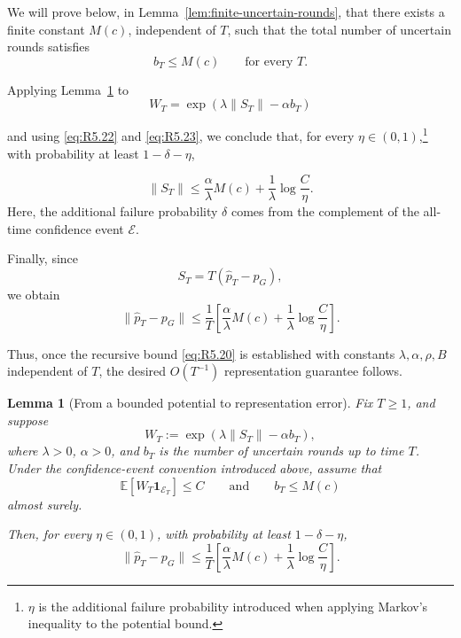 \documentclass[twoside]{article}
\newtheorem{lemma}{Lemma}
\begin{document}
We will prove below, in Lemma~\ref{lem:finite-uncertain-rounds}, that there
exists a finite constant \(M(c)\), independent of \(T\), such that the total
number of uncertain rounds satisfies
\begin{equation}
    b_T\le M(c)
    \qquad\text{for every }T.
    \tag{R5.23}
    \label{eq:R5.23}
\end{equation}

Applying Lemma~\ref{lem:potential-to-representation} to
\[
    W_T
    =
    \exp\left(
        \lambda\|S_T\|-\alpha b_T
    \right)
\]

and using \eqref{eq:R5.22} and \eqref{eq:R5.23}, we conclude that, for every
\(\eta\in(0,1)\),\footnote{\(\eta\) is the additional failure probability
introduced when applying Markov's inequality to the potential bound.}
with probability at least \(1-\delta-\eta\),

\begin{equation}
    \|S_T\|
    \le
    \frac{\alpha}{\lambda}M(c)
    +
    \frac{1}{\lambda}
    \log\frac{C}{\eta}.
    \tag{R5.24}
    \label{eq:R5.24}
\end{equation}
Here, the additional failure probability \(\delta\) comes from the complement
of the all-time confidence event \(\mathcal E\).

Finally, since
\[
    S_T
    =
    T(\widehat p_T-p_G),
\]
we obtain
\begin{equation}
    \boxed{
        \|\widehat p_T-p_G\|
        \le
        \frac{1}{T}
        \left[
            \frac{\alpha}{\lambda}M(c)
            +
            \frac{1}{\lambda}
            \log\frac{C}{\eta}
        \right].
    }
    \tag{R5.25}
    \label{eq:R5.25}
\end{equation}

Thus, once the recursive bound \eqref{eq:R5.20} is established with constants
\(\lambda,\alpha,\rho,B\) independent of \(T\), the desired
\(O(T^{-1})\) representation guarantee follows.

\begin{lemma}[From a bounded potential to representation error]
\label{lem:potential-to-representation}
Fix \(T\ge1\), and suppose
\[
    W_T
    :=
    \exp\left(
        \lambda\|S_T\|-\alpha b_T
    \right),
\]
where \(\lambda>0\), \(\alpha>0\), and \(b_T\) is the number of uncertain
rounds up to time \(T\). Under the confidence-event convention introduced
above, assume that
\[
\mathbb E\!\left[
W_T\mathbf 1_{\mathcal E_T}
\right]
\le C
\qquad\text{and}\qquad
b_T\le M(c)
\]
almost surely.

Then, for every \(\eta\in(0,1)\), with probability at least
\(1-\delta-\eta\),
\begin{equation}
    \|\widehat p_T-p_G\|
    \le
    \frac{1}{T}
    \left[
        \frac{\alpha}{\lambda}M(c)
        +
        \frac{1}{\lambda}
        \log\frac{C}{\eta}
    \right].
    \label{eq:potential-to-representation-bound}
\end{equation}
\end{lemma}
\end{document}
